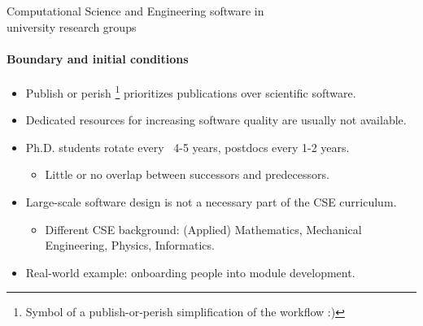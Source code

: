 \documentclass[
	aspectratio=169,%
	color={accentcolor=2d},
	logo=true,%
	colorframetitle=true,%
	]{tudabeamer}
\begin{document}


\begin{frame}{Computational Science and Engineering software in\\university research groups}
	\framesubtitle{Boundary and initial conditions}
	
	\vfill
	\begin{itemize}
            \item Publish or perish \faGraduationCap\footnote{Symbol of a publish-or-perish simplification of the workflow :)} prioritizes publications over scientific software.
		\item Dedicated resources for increasing software quality are usually not available.
		\item Ph.D. students rotate every ~4-5 years, postdocs every 1-2 years. 
			\begin{itemize}
				\item Little or no overlap between successors and predecessors. 
			\end{itemize}
		\item Large-scale software design is not a necessary part of the CSE curriculum. 
			\begin{itemize}
				\item Different CSE background: (Applied) Mathematics, Mechanical Engineering, Physics, Informatics.
			\end{itemize}
		\item Real-world example: onboarding people into \href{https://www.openfoam.com/documentation/guides/latest/api/classes.html}{} module development.
	\end{itemize}
\end{frame}
\end{document}
